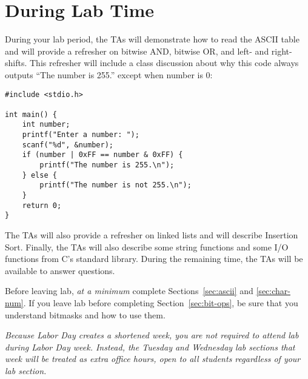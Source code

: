 \section*{During Lab Time}

During your lab period, the TAs will demonstrate how to read the ASCII table and will provide a refresher on bitwise AND, bitwise OR, and left- and right-shifts.
This refresher will include a class discussion about why this code always outputs ``The number is 255.'' except when number is 0:

\begin{lstlisting}
#include <stdio.h>

int main() {
    int number;
    printf("Enter a number: ");
    scanf("%d", &number);
    if (number | 0xFF == number & 0xFF) {
        printf("The number is 255.\n");
    } else {
        printf("The number is not 255.\n");
    }
    return 0;
}
\end{lstlisting}

The TAs will also provide a refresher on linked lists and will describe Insertion Sort.
Finally, the TAs will also describe some string functions and some I/O functions from C's standard library.
During the remaining time, the TAs will be available to answer questions.

Before leaving lab, \textit{at a minimum} complete Sections~\ref{sec:ascii} and \ref{sec:char-num}.
If you leave lab before completing Section~\ref{sec:bit-ops}, be sure that you understand bitmasks and how to use them.

\textit{Because Labor Day creates a shortened week, you are not required to attend lab during Labor Day week.
Instead, the Tuesday and Wednesday lab sections that week will be treated as extra office hours, open to all students regardless of your lab section.}
